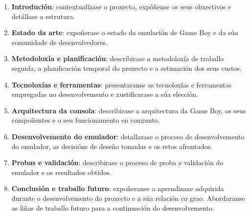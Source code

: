 \begin{enumerate}
    \item \textbf{Introdución}: contextualízase o proxecto, expóñense os seus obxectivos e detállase a estrutura.
    \item \textbf{Estado da arte}: expoñerase o estado da emulación de Game Boy e da súa comunidade de desenvolvedores.
    \item \textbf{Metodoloxía e planificación}: describirase a metodoloxía de traballo seguida, a planificación temporal do proxecto e a estimación dos seus custos.
    \item \textbf{Tecnoloxías e ferramentas}: presentaranse as tecnoloxías e ferramentas empregadas no desenvolvemento e xustificarase a súa elección.
    \item \textbf{Arquitectura da consola}: describirase a arquitectura da Game Boy, os seus compoñentes e o seu funcionamento en conxunto.
    \item \textbf{Desenvolvemento do emulador}: detallarase o proceso de desenvolvemento do emulador, as decisións de deseño tomadas e os retos afrontados.
    \item \textbf{Probas e validación}: describirase o proceso de proba e validación do emulador e os resultados obtidos.
    \item \textbf{Conclusión e traballo futuro}: expoñeranse a aprendizaxe adquirida durante o desenvolvemento do proxecto e a súa relación co grao. Abordaranse as liñas de traballo futuro para a continuación do desenvolvemento.
\end{enumerate}
